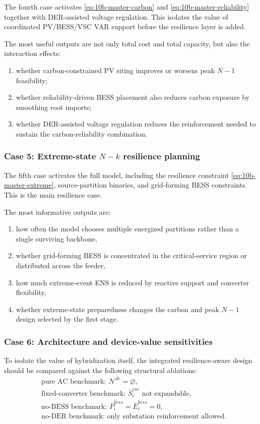 The fourth case activates \eqref{eq:10b-master-carbon} and \eqref{eq:10b-master-reliability} together with DER-assisted voltage regulation. This isolates the value of coordinated PV/BESS/VSC VAR support before the resilience layer is added.

The most useful outputs are not only total cost and total capacity, but also the interaction effects:
\begin{enumerate}
  \item whether carbon-constrained PV siting improves or worsens peak \(N{-}1\) feasibility;
  \item whether reliability-driven BESS placement also reduces carbon exposure by smoothing root imports;
  \item whether DER-assisted voltage regulation reduces the reinforcement needed to sustain the carbon-reliability combination. 
\end{enumerate}

\subsubsection{Case 5: Extreme-state \texorpdfstring{$N{-}k$}{N-k} resilience planning}

The fifth case activates the full model, including the resilience constraint \eqref{eq:10b-master-extreme}, source-partition binaries, and grid-forming BESS constraints. This is the main resilience case.

The most informative outputs are:
\begin{enumerate}
  \item how often the model chooses multiple energized partitions rather than a single surviving backbone,
  \item whether grid-forming BESS is concentrated in the critical-service region or distributed across the feeder,
  \item how much extreme-event ENS is reduced by reactive support and converter flexibility,
  \item whether extreme-state preparedness changes the carbon and peak \(N{-}1\) design selected by the first stage.
\end{enumerate}

\subsubsection{Case 6: Architecture and device-value sensitivities}

To isolate the value of hybridization itself, the integrated resilience-aware design should be compared against the following structural ablations:
\begin{align}
&\text{pure AC benchmark: } \mathcal{N}^{dc}=\varnothing, \\
&\text{fixed-converter benchmark: } \overline S_c^{vsc} \text{ not expandable}, \\
&\text{no-BESS benchmark: } \overline P_i^{bess}=\overline E_i^{bess}=0, \\
&\text{no-DER benchmark: only substation reinforcement allowed}. 
\end{align}

